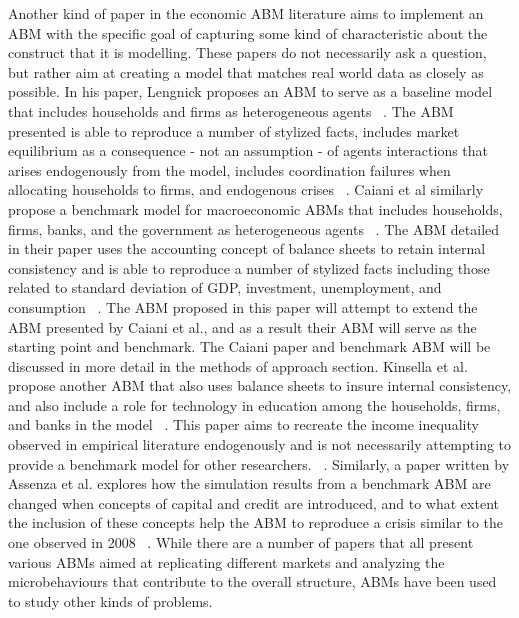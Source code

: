 \documentclass[11pt]{article}
\begin{document}
Another kind of paper in the economic ABM literature aims to implement an ABM with
the specific goal of capturing some kind of characteristic about the construct
that it is modelling. These papers do not necessarily ask a question, but rather
aim at creating a model that matches real world data as closely as possible. In
 his paper, Lengnick proposes an ABM to serve as a baseline model that includes
  households and firms as heterogeneous agents  ~\cite{Lengnick-baseline-paper}.
The ABM presented is able to reproduce a number of stylized facts, includes
market equilibrium as a consequence - not an assumption - of agents interactions
that arises endogenously from the model, includes coordination failures when
allocating households to firms, and endogenous crises ~\cite{Lengnick-baseline-paper}.
 Caiani et al similarly propose a benchmark model for macroeconomic ABMs
 that includes households, firms, banks, and the government as heterogeneous
agents ~\cite{Caiani-benchmark-paper}. The ABM detailed in their paper uses the
accounting concept of balance sheets to retain internal consistency and is able
to reproduce a number of stylized facts including those related to standard
deviation of GDP, investment, unemployment, and consumption ~\cite{Caiani-benchmark-paper}.
The ABM proposed in this paper will attempt to extend the ABM presented by Caiani et al.,
and as a result their ABM will serve as the starting point and benchmark. The Caiani
paper and benchmark ABM will be discussed in more detail in the methods of approach
section. Kinsella et al. propose another ABM that also uses balance sheets to insure
internal consistency, and also include a role for technology in education among the
households, firms, and banks in the model ~\cite{Kinsella-education-paper}.
This paper aims to recreate the income inequality observed in empirical literature
endogenously and is not necessarily attempting to provide a benchmark model for
other researchers. ~\cite{Kinsella-education-paper}. Similarly, a paper written by
Assenza et al. explores how the simulation results from a benchmark ABM are changed
when concepts of capital and credit are introduced, and to what extent the inclusion
of these concepts help the ABM to reproduce a crisis similar to the one observed in
2008 ~\cite{Assenza-capital-paper}. While there are a number of papers that all
present various ABMs aimed at replicating different markets and analyzing the
microbehaviours that contribute to the overall structure, ABMs have been used
to study other kinds of problems.
\end{document}
